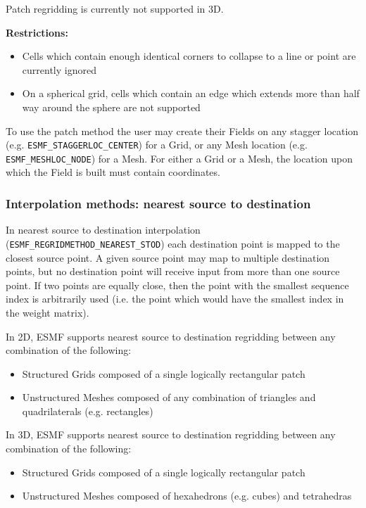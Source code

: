 \smallskip

 Patch regridding is currently not supported in 3D.

\smallskip

{\bf Restrictions:}
 \begin{itemize}
 \item Cells which contain enough identical corners to collapse to a line or point are currently ignored
 \item On a spherical grid, cells which contain an edge which extends more than half way around the sphere are not supported 
 \end{itemize}

 To use the patch method the user may create their Fields on any stagger location (e.g. {\tt ESMF\_STAGGERLOC\_CENTER}) for a Grid, or
 any Mesh location (e.g. {\tt ESMF\_MESHLOC\_NODE}) for a Mesh. For either a Grid or a Mesh, the location upon which the Field is built 
 must contain coordinates. 

\subsubsection{Interpolation methods: nearest source to destination}\label{sec:interpolation:neareststod}
In nearest source to destination interpolation ({\tt ESMF\_REGRIDMETHOD\_NEAREST\_STOD}) each destination point is mapped to the closest source point. A given source point may map to multiple destination points, but no destination point will receive input from more than one source point. If two points are equally close, then the point with the smallest sequence index is arbitrarily used (i.e. the point which would have the smallest index in the weight matrix). 

\smallskip

 In 2D, ESMF supports nearest source to destination regridding between any combination of the following:
 \begin{itemize}
 \item Structured Grids composed of a single logically rectangular patch
 \item Unstructured Meshes composed of any combination of triangles and quadrilaterals (e.g. rectangles)
 \end{itemize}

\smallskip

 In 3D, ESMF supports nearest source to destination regridding between any combination of the following:
 \begin{itemize}
 \item Structured Grids composed of a single logically rectangular patch
 \item Unstructured Meshes composed of hexahedrons (e.g. cubes) and tetrahedras
 \end{itemize}

